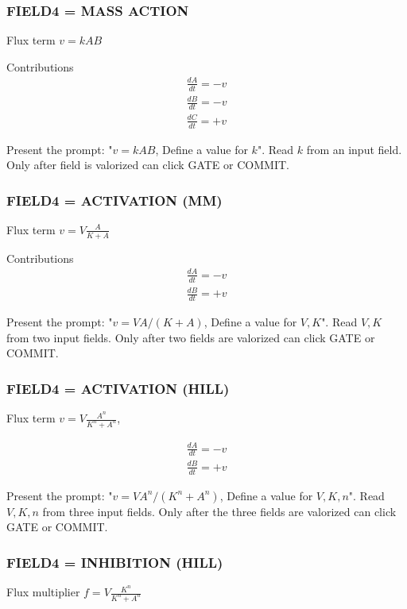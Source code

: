 \documentclass[11pt, oneside]{article}
\begin{document}
\subsubsection{FIELD4 = MASS ACTION}

Flux term $v = kAB$ 

Contributions
\begin{align}
\frac{dA}{dt} = -v \\
\frac{dB}{dt} = -v \\
\frac{dC}{dt} = +v
\end{align}

Present the prompt: "$v = kAB$, Define a value for $k$". Read $k$ from an input field.
Only after field is valorized can click GATE or COMMIT.


\subsubsection{FIELD4 = ACTIVATION (MM)}

Flux term $v = V \tfrac{ A }{ K + A}$ 

Contributions
\begin{align}
\frac{dA}{dt} = -v \\
\frac{dB}{dt} = +v
\end{align}

Present the prompt: "$v = V A/(K+A)$, Define a value for $V,K$". Read $V,K$ from two input fields.
Only after two fields are valorized can click GATE or COMMIT.


\subsubsection{FIELD4 = ACTIVATION (HILL)}

Flux term $v = V \tfrac{ A^n }{ K^n + A^n}$,

\begin{align}
\frac{dA}{dt} = -v \\
\frac{dB}{dt} = +v
\end{align}

Present the prompt: "$v = V A^n/(K^n+A^n)$, Define a value for $V,K,n$". Read $V,K,n$ from three input fields.
Only after the three fields are valorized can click GATE or COMMIT.


\subsubsection{FIELD4 = INHIBITION (HILL)}

Flux multiplier $f = V \tfrac{ K^n }{ K^n + A^n}$
\end{document}
